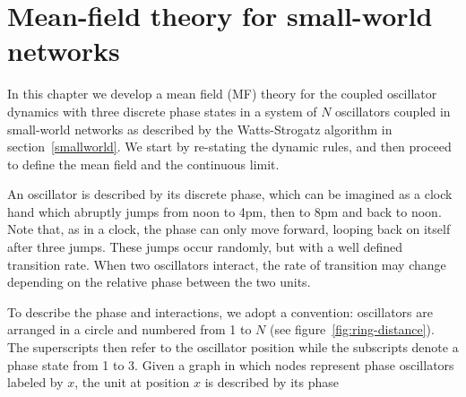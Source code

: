 \chapter{Mean-field theory for small-world networks}
\label{chap:mf}


In this chapter we develop a mean field (MF) theory for the coupled oscillator dynamics with three discrete phase states in a system of
$N$ oscillators coupled in small-world networks as described by the Watts-Strogatz algorithm in section~\ref{smallworld}. We start by
re-stating the dynamic rules, and then proceed to define the mean field and the continuous limit.

\begin{table}[ht] 
  \centering
  \caption{Definitions}
\end{table}

An oscillator is described by its discrete phase, which can be imagined as a clock hand which abruptly jumps from noon to 4pm, then to
8pm and back to noon. Note that, as in a clock, the phase can only move forward, looping back on itself after three jumps.  These jumps
occur randomly, but with a well defined transition rate. When two oscillators interact, the rate of transition may change depending on
the relative phase between the two units.

To describe the phase and interactions, we adopt a convention: oscillators are arranged in a circle and numbered from 1 to $N$ (see
figure~\ref{fig:ring-distance}). The superscripts then refer to the oscillator position while the subscripts denote a phase state from
1 to 3. Given a graph in which nodes represent phase oscillators labeled by $x$, the unit at position $x$ is described by its phase

